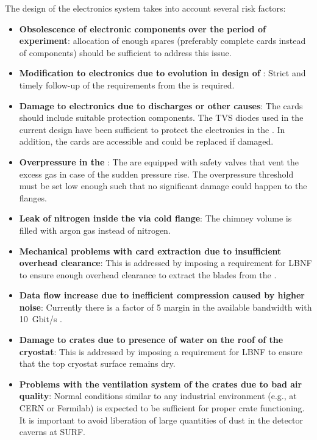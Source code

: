 The design of the \dual electronics system takes into account several risk factors:
\begin{itemize}
\item{\textbf{Obsolescence of electronic components over the period of experiment}: allocation of enough spares (preferably complete cards instead of components) should be sufficient to address this issue. }
\item{\textbf{Modification to  electronics due to evolution in design of }: Strict and timely follow-up of the  requirements from the \dual {} is required.}
\item{\textbf{Damage to electronics due to  discharges or other causes}: 
The  cards should include suitable protection components. The TVS diodes used in the current design  have been sufficient to protect the electronics in the . 
 In addition, the cards are accessible and could be replaced if damaged. }
\item{\textbf{Overpressure in the }: The  are equipped with safety valves that vent the excess gas in case of the sudden pressure rise. The overpressure threshold must be set low enough such that no significant damage could happen to the flanges. }
\item{\textbf{Leak of nitrogen inside the  via cold flange}: The chimney volume is filled with argon gas instead of nitrogen.}
\item{\textbf{Mechanical problems with  card extraction due to insufficient overhead clearance}: This is addressed by imposing a requirement for LBNF to ensure enough overhead clearance to extract the blades from the .}
\item{\textbf{Data flow increase due to inefficient compression caused by higher noise}: Currently there is a factor of \num{5} margin in the available bandwidth with \SI{10}{Gbit/s} .} 
\item{\textbf{Damage to  crates due to presence of water on the roof of the cryostat}: This is addressed by imposing a requirement for LBNF to ensure that the top cryostat surface remains dry.}
\item{\textbf{Problems with the ventilation system of the  crates due to bad air quality}: Normal conditions similar to any industrial environment (e.g., at CERN or Fermilab) is expected to be sufficient for proper crate functioning. It is important to avoid liberation of large quantities of dust in the detector caverns at SURF.} 
\end{itemize}
